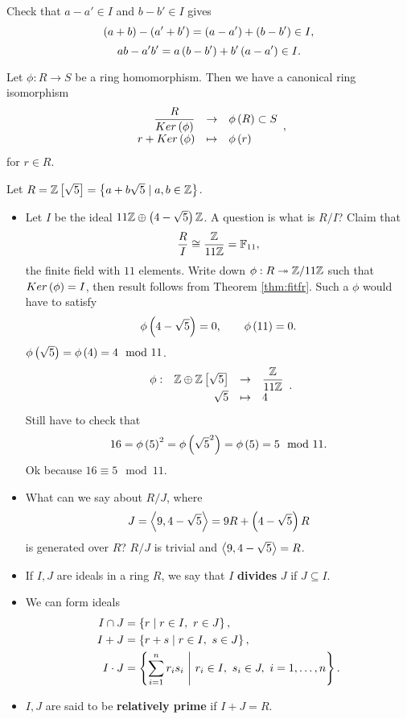 Check that $ a - a' \in I $ and $ b - b' \in I $ gives
$$ \left( a + b \right) - \left( a' + b' \right) = \left( a - a' \right) + \left( b - b' \right) \in I, $$
$$ ab - a'b' = a\left( b - b' \right) + b'\left( a - a' \right) \in I. $$

\begin{theorem}
\label{thm:fitfr}
Let $ \phi : R \to S $ be a ring homomorphism. Then we have a canonical ring isomorphism
$$ \function{\dfrac{R}{Ker\rb{\phi}}}{\phi\rb{R} \subset S}{r + Ker\rb{\phi}}{\phi\rb{r}}, $$
for $ r \in R $.
\end{theorem}

\begin{example1}
Let $ R = \mathbb{Z}\left[ \sqrt{5} \right] = \left\{ a + b\sqrt{5} \mid a, b \in \mathbb{Z} \right\} $.
\begin{itemize}
\item Let $ I $ be the ideal $ 11\mathbb{Z} \oplus \left( 4 - \sqrt{5} \right)\mathbb{Z} $. A question is what is $ R / I $? Claim that
$$ \dfrac{R}{I} \cong \dfrac{\mathbb{Z}}{11\mathbb{Z}} = \mathbb{F}_{11}, $$
the finite field with $ 11 $ elements. Write down $ \phi : R \twoheadrightarrow \mathbb{Z} / 11\mathbb{Z} $ such that $ Ker\left( \phi \right) = I $, then result follows from Theorem \ref{thm:fitfr}. Such a $ \phi $ would have to satisfy
$$ \phi\left( 4 - \sqrt{5} \right) = 0, \qquad \phi\left( 11 \right) = 0. $$
$ \phi\left( \sqrt{5} \right) = \phi\left( 4 \right) = 4 \mod 11 $.
$$ \function[\phi]{\Z \oplus \Z\sb{\sqrt{5}}}{\dfrac{\Z}{11\Z}}{\sqrt{5}}{4}. $$
Still have to check that
$$ 16 = \phi\left( 5 \right)^2 = \phi\left( \sqrt{5}^2 \right) = \phi\left( 5 \right) = 5 \mod 11. $$
Ok because $ 16 \equiv 5 \mod 11 $.
\item What can we say about $ R / J $, where
$$ J = \left\langle 9, 4 - \sqrt{5} \right\rangle = 9R + \left( 4 - \sqrt{5} \right)R $$
is generated over $ R $? $ R / J $ is trivial and $ \left\langle 9, 4 - \sqrt{5} \right\rangle = R $.
\end{itemize}
\end{example1}

\begin{definition}
\hfill
\begin{itemize}
\item If $ I, J $ are ideals in a ring $ R $, we say that $ I $ \textbf{divides} $ J $ if $ J \subseteq I $.
\item We can form ideals
\begin{align*}
I \cap J & = \left\{ r \mid r \in I, \ r \in J \right\}, \\
I + J & = \left\{ r + s \mid r \in I, \ s \in J \right\}, \\
I \cdot J & = \left\{ \sum_{i = 1}^n r_is_i \ \Bigg| \ r_i \in I, \ s_i \in J, \ i = 1, \dots, n \right\}.
\end{align*}
\item $ I, J $ are said to be \textbf{relatively prime} if $ I + J = R $.
\end{itemize}
\end{definition}

